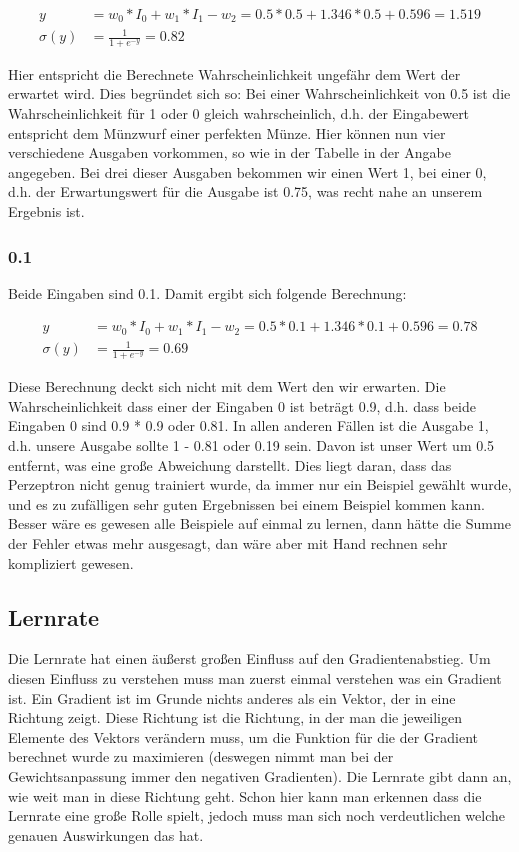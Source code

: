 \documentclass[a4paper]{article}
\begin{document}
\begin{align*}
	y &= w_0 * I_0 + w_1 * I_1 - w_2 = 0.5 * 0.5 + 1.346 * 0.5 + 0.596 = 1.519 \\
	\sigma(y) &= \frac{1}{1 + e^{-y}} = 0.82
\end{align*}

Hier entspricht die Berechnete Wahrscheinlichkeit ungefähr dem Wert der erwartet wird. Dies begründet sich so: Bei einer Wahrscheinlichkeit von 0.5 ist die Wahrscheinlichkeit für 1 oder 0 gleich wahrscheinlich, d.h. der Eingabewert entspricht dem Münzwurf einer perfekten Münze. Hier können nun vier verschiedene Ausgaben vorkommen, so wie in der Tabelle in der Angabe angegeben. Bei drei dieser Ausgaben bekommen wir einen Wert 1, bei einer 0, d.h. der Erwartungswert für die Ausgabe ist 0.75, was recht nahe an unserem Ergebnis ist.

\subsubsection{0.1}
Beide Eingaben sind 0.1. Damit ergibt sich folgende Berechnung:

\begin{align*}
	y &= w_0 * I_0 + w_1 * I_1 - w_2 = 0.5 * 0.1 + 1.346 * 0.1 + 0.596 = 0.78 \\
	\sigma(y) &= \frac{1}{1 + e^{-y}} = 0.69
\end{align*}

Diese Berechnung deckt sich nicht mit dem Wert den wir erwarten. Die Wahrscheinlichkeit dass einer der Eingaben 0 ist beträgt 0.9, d.h. dass beide Eingaben 0 sind 0.9 * 0.9 oder 0.81. In allen anderen Fällen ist die Ausgabe 1, d.h. unsere Ausgabe sollte 1 - 0.81 oder 0.19 sein. Davon ist unser Wert um 0.5 entfernt, was eine große Abweichung darstellt. Dies liegt daran, dass das Perzeptron nicht genug trainiert wurde, da immer nur ein Beispiel gewählt wurde, und es zu zufälligen sehr guten Ergebnissen bei einem Beispiel kommen kann. Besser wäre es gewesen alle Beispiele auf einmal zu lernen, dann hätte die Summe der Fehler etwas mehr ausgesagt, dan wäre aber mit Hand rechnen sehr kompliziert gewesen.

\subsection{Lernrate}
Die Lernrate hat einen äußerst großen Einfluss auf den Gradientenabstieg. Um diesen Einfluss zu verstehen muss man zuerst einmal verstehen was ein Gradient ist. Ein Gradient ist im Grunde nichts anderes als ein Vektor, der in eine Richtung zeigt. Diese Richtung ist die Richtung, in der man die jeweiligen Elemente des Vektors verändern muss, um die Funktion für die der Gradient berechnet wurde zu maximieren (deswegen nimmt man bei der Gewichtsanpassung immer den negativen Gradienten). Die Lernrate gibt dann an, wie weit man in diese Richtung geht. Schon hier kann man erkennen dass die Lernrate eine große Rolle spielt, jedoch muss man sich noch verdeutlichen welche genauen Auswirkungen das hat.
\end{document}
